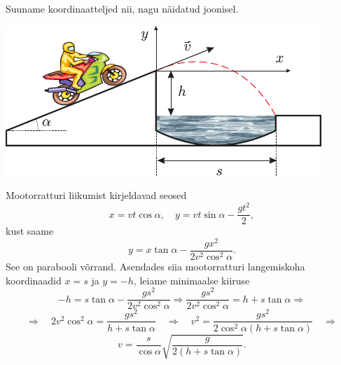 \documentclass[10pt]{article}
\begin{document}
{%

\solu
Suuname koordinaatteljed nii, nagu näidatud joonisel.

\begin{center}
	\includegraphics[width=0.8\linewidth]{2007-lahg-05-lah}
\end{center}

Mootorratturi liikumist kirjeldavad seosed
\[
x=v t \cos \alpha, \quad y=v t \sin \alpha-\frac{g t^{2}}{2},
\]
kust saame
\[
y=x \tan \alpha-\frac{g x^{2}}{2 v^{2} \cos ^{2} \alpha}.
\]
See on parabooli võrrand. Asendades siia mootorratturi langemiskoha koordinaadid $x = s$ ja $y = -h$, leiame minimaalse kiiruse
\[
-h=s \tan \alpha-\frac{g s^{2}}{2 v^{2} \cos ^{2} \alpha} \Rightarrow \frac{g s^{2}}{2 v^{2} \cos ^{2} \alpha}=h+s \tan \alpha \Rightarrow
\]
\[
\Rightarrow \quad 2 v^{2} \cos ^{2} \alpha=\frac{g s^{2}}{h+s \tan \alpha} \quad \Rightarrow \quad v^{2}=\frac{g s^{2}}{2 \cos ^{2} \alpha(h+s \tan \alpha)} \quad \Rightarrow
\]
\[
v=\frac{s}{\cos \alpha} \sqrt{\frac{g}{2(h+s \tan \alpha)}}.
\]
\probend
\bigskip


}
\end{document}
